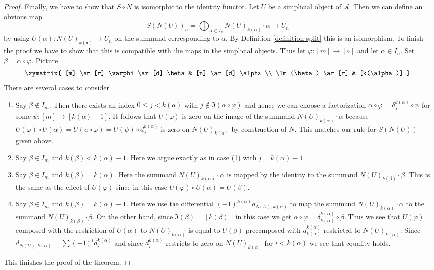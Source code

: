 \begin{proof}
\medskip\noindent
Finally, we have to show that $S \circ N$ is isomorphic to the
identity functor. Let $U$ be a simplicial object of $\mathcal{A}$.
Then we can define an obvious map
$$
S(N(U))_n = \bigoplus\nolimits_{\alpha \in I_n} N(U)_{k(\alpha)} \cdot \alpha
\longrightarrow
U_n
$$
by using $U(\alpha) : N(U)_{k(\alpha)} \to U_n$ on the summand corresponding
to $\alpha$. By Definition \ref{definition-split} this is an isomorphism.
To finish the proof we have to show that this is compatible with
the maps in the simplicial objects. Thus let $\varphi : [m] \to [n]$
and let $\alpha \in I_n$. Set $\beta = \alpha \circ \varphi$.
Picture
$$
\xymatrix{
[m] \ar[r]_\varphi \ar[d]_\beta &
[n] \ar[d]_\alpha \\
\Im(\beta) \ar[r] &
[k(\alpha)]
}
$$
There are several cases to consider
\begin{enumerate}
\item Say $\beta \not \in I_m$. Then there exists an index
$0 \leq j < k(\alpha)$ with $j \not \in \Im(\alpha \circ \varphi)$
and hence we can choose a factorization
$\alpha \circ \varphi = \delta^{k(\alpha)}_j \circ \psi$
for some $\psi : [m] \to [k(\alpha) - 1]$.
It follows that $U(\varphi)$ is zero on the image of the summand
$N(U)_{k(\alpha)} \cdot \alpha$ because $U(\varphi) \circ U(\alpha) =
U(\alpha \circ \varphi) = U(\psi) \circ d^{k(\alpha)}_j$
is zero on $N(U)_{k(\alpha)}$ by construction of $N$.
This matches our rule for $S(N(U))$ given above.
\item Say $\beta \in I_m$ and $k(\beta) < k(\alpha) - 1$. Here we
argue exactly as in case (1) with $j = k(\alpha) - 1$.
\item Say $\beta \in I_m$ and $k(\beta) = k(\alpha)$. Here
the summand $N(U)_{k(\alpha)} \cdot \alpha$ is mapped by the
identity to the summand $N(U)_{k(\beta)} \cdot \beta$.
This is the same as the effect of $U(\varphi)$ since in
this case $U(\varphi) \circ U(\alpha) = U(\beta)$.
\item Say $\beta \in I_m$ and $k(\beta) = k(\alpha) - 1$.
Here we use the differential $(-1)^{k(\alpha)} d_{N(U), k(\alpha)}$
to map the summand $N(U)_{k(\alpha)} \cdot \alpha$
to the summand $N(U)_{k(\beta)} \cdot \beta$.
On the other hand, since $\Im(\beta) = [k(\beta)]$ in this case
we get $\alpha \circ \varphi = \delta^{k(\alpha)}_{k(\alpha)} \circ \beta$.
Thus we see that $U(\varphi)$ composed with the restriction of
$U(\alpha)$ to $N(U)_{k(\alpha)}$ is equal to
$U(\beta)$ precomposed with $d^{k(\alpha)}_{k(\alpha)}$ restricted to
$N(U)_{k(\alpha)}$.
Since $d_{N(U), k(\alpha)} = \sum (-1)^i d^{k(\alpha)}_i$
and since $d^{k(\alpha)}_i$ restricts to zero on
$N(U)_{k(\alpha)}$ for $i < k(\alpha)$
we see that equality holds.
\end{enumerate}
This finishes the proof of the theorem.
\end{proof}







